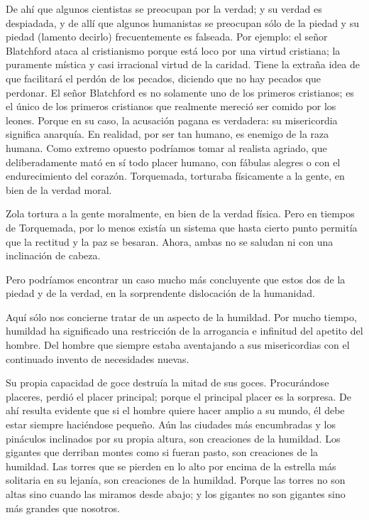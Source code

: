 De ahí que algunos cientistas se preocupan por la verdad; y su verdad es despiadada, y de allí que
algunos humanistas se preocupan sólo de la piedad y su piedad (lamento decirlo) frecuentemente es
falseada. Por ejemplo: el señor Blatchford ataca al cristianismo porque está loco por una virtud cristiana;
la puramente mística y casi irracional virtud de la caridad. Tiene la extraña idea de que facilitará el perdón
de los pecados, diciendo que no hay pecados que perdonar. El señor Blatchford es no solamente uno de
los primeros cristianos; es el único de los primeros cristianos que realmente mereció ser comido por los
leones. Porque en su caso, la acusación pagana es verdadera: su misericordia significa anarquía. En
realidad, por ser tan humano, es enemigo de la raza humana. Como extremo opuesto podríamos tomar al
realista agriado, que deliberadamente mató en sí todo placer humano, con fábulas alegres o con el
endurecimiento del corazón. Torquemada, torturaba físicamente a la gente, en bien de la verdad moral.

Zola tortura a la gente moralmente, en bien de la verdad física. Pero en tiempos de Torquemada, por lo
menos existía un sistema que hasta cierto punto permitía que la rectitud y la paz se besaran. Ahora, ambas
no se saludan ni con una inclinación de cabeza.

Pero podríamos encontrar un caso mucho más concluyente que estos dos de la piedad y de la
verdad, en la sorprendente dislocación de la humanidad.

Aquí sólo nos concierne tratar de un aspecto de la humildad. Por mucho tiempo, humildad ha
significado una restricción de la arrogancia e infinitud del apetito del hombre. Del hombre que siempre
estaba aventajando a sus misericordias con el continuado invento de necesidades nuevas.

Su propia capacidad de goce destruía la mitad de sus goces. Procurándose placeres, perdió el placer
principal; porque el principal placer es la sorpresa. De ahí resulta evidente que si el hombre quiere hacer
amplio a su mundo, él debe estar siempre haciéndose pequeño. Aún las ciudades más encumbradas y los
pináculos inclinados por su propia altura, son creaciones de la humildad. Los gigantes que derriban
montes como si fueran pasto, son creaciones de la humildad. Las torres que se pierden en lo alto por
encima de la estrella más solitaria en su lejanía, son creaciones de la humildad. Porque las torres no son
altas sino cuando las miramos desde abajo; y los gigantes no son gigantes sino más grandes que nosotros.

